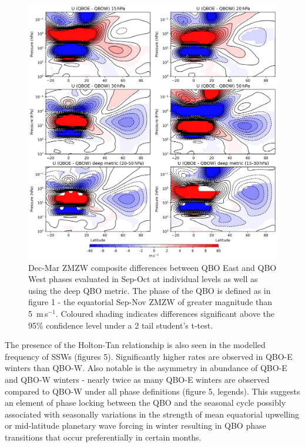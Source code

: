 \begin{figure}[h!]
\begin{center}
\noindent\includegraphics[width = 0.85\linewidth]{Figures/Figures-origins/holton_tan_composites.png}
\caption[ZMZW composite differences between QBO phases in UKESM.]{Dec-Mar ZMZW composite differences between QBO East and QBO West phases evaluated in Sep-Oct at individual levels as well as using the deep QBO metric. The phase of the QBO is defined as in figure 1 - the equatorial Sep-Nov ZMZW of greater magnitude than 5\ m\,s$^{-1}$. Coloured shading indicates differences significant above the 95\% confidence level under a 2 tail student’s t-test.}
\label{fig:holton_tan_comp}
\end{center}
\end{figure}

The presence of the Holton-Tan relationship is also seen in the modelled frequency of SSWs (figures 5). Significantly higher rates are observed in QBO-E winters than QBO-W. Also notable is the asymmetry in abundance of QBO-E and QBO-W winters - nearly twice as many QBO-E winters are observed compared to QBO-W under all phase definitions (figure 5, legends). This suggests an element of phase locking between the QBO and the seasonal cycle possibly associated with seasonally variations in the strength of mean equatorial upwelling or mid-latitude planetary wave forcing in winter \citep{Pascoe2005, Gruzdez2000, Kylash2015} resulting in QBO phase transitions that occur preferentially in certain months. 

